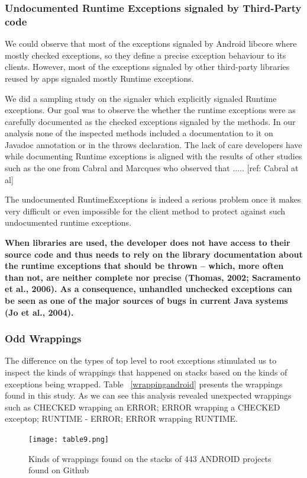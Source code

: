 \documentclass[conference]{IEEEtran}
\begin{document}
\subsubsection{Undocumented Runtime Exceptions signaled by Third-Party code}
We could observe that most of the exceptions signaled by Android libcore where mostly checked exceptions, so they define a precise exception behaviour to its clients. However, most of the exceptions signaled by other third-party libraries reused by apps signaled mostly Runtime exceptions. 

We did a sampling study on the signaler which explicitly signaled Runtime exceptions. Our goal was to observe the whether the runtime exceptions were as carefully documented as the checked exceptions signaled by the methods. In our analysis none of the inspected methods included a documentation to it on Javadoc annotation or in the throws declaration. The lack of care developers have while documenting Runtime exceptions is aligned with the results of other studies such as the one from Cabral and Marcques who observed that ..... [ref: Cabral at al]

The undocumented RuntimeExceptions is indeed a serious problem once it makes very difficult or even impossible for the  client method to protect against such undocumented runtime exceptions.

\textbf{When libraries are used, the developer does not have access to their source code and thus needs to rely on the library documentation about the runtime exceptions that should be thrown – which, more often than not, are neither complete nor precise (Thomas, 2002; Sacramento et al., 2006). 
As a consequence, unhandled unchecked exceptions can be seen as one of the major sources of bugs in current Java systems (Jo et al., 2004). }

\subsubsection{Odd Wrappings}
The difference on the types of top level to root exceptions stimulated us to inspect the kinds of wrappings that happened on stacks based on the kinds of exceptions being wrapped.  Table ~\ref{wrappingandroid} presents the wrappings found in this study. As we can see this analysis revealed unexpected wrappings such as CHECKED wrapping an  ERROR; ERROR wrapping a CHECKED exceptop; RUNTIME - ERROR; ERROR wrapping RUNTIME.


\begin{figure}
\centering
\texttt{[image: table9.png]}
\caption{Kinds of wrappings found on the stacks of 443 ANDROID projects found on Github}
\label{fig:wrappingandroid}
\end{figure}
\end{document}
